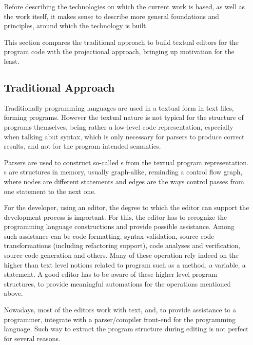 
Before describing the technologies on which the current work is based, as well as the work itself,
it makes sense to describe more general foundations and principles, around which the technology is built.


This section compares the traditional approach to build textual editors for the program code with
the projectional approach, bringing up  motivation for the least.

\subsection{Traditional Approach}
Traditionally programming languages are used in a textual form in text files, forming programs.
However the textual nature is not typical for the structure of programs themselves, being rather a low-level code representation, especially when talking abut syntax, which is only necessary for 
parsers to produce correct results, and not for the program intended semantics.


Parsers are used to construct so-called s from the textual 
program representation. s are structures in memory, usually graph-alike, 
reminding a control flow graph, where nodes are different statements and edges are 
the ways control passes from one statement to the next one.

For the developer, using an editor, the degree to which the editor can support the development
process is important. For this, the editor has to recognize the programming language constructions and provide possible assistance. Among such assistance can be code formatting, syntax validation,
source code transformations (including refactoring support), code analyses and verification, 
source code generation and others. Many of these operation rely indeed on the higher than text level notions related to program such as a method, a variable, a statement. 
A good editor has to be aware of these higher level program structures, to provide meaningful automations for the operations mentioned above.

Nowadays, most of the editors work with text, and, to provide assistance to a programmer, integrate
with a parser/compiler front-end for the programming language. Such way to extract the program
structure during editing is not perfect for several reasons. 

